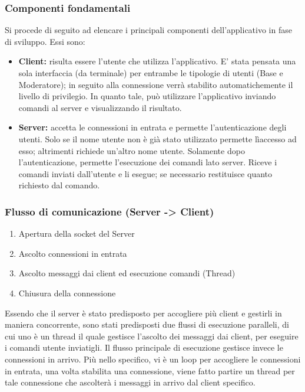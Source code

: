 \subsubsection{Componenti fondamentali}
Si procede di seguito ad elencare i principali componenti dell'applicativo in fase di sviluppo. Essi sono:
\begin{itemize}
    \item \textbf{Client:} risulta essere l'utente che utilizza l'applicativo. E' stata pensata una sola interfaccia (da terminale) per entrambe le tipologie di utenti (Base e Moderatore); in seguito alla connessione verrà stabilito automatichemente il livello di privilegio. In quanto tale, può utilizzare l'applicativo inviando comandi al server e visualizzando il risultato. \newline
    \item \textbf{Server: } accetta le connessioni in entrata e permette l'autenticazione degli utenti. Solo se il nome utente non è già stato utilizzato permette lìaccesso ad esso; altrimenti richiede un'altro nome utente. Solamente dopo l'autenticazione, permette l'esecuzione dei comandi lato server. Riceve i comandi inviati dall'utente e li esegue; se necessario restituisce quanto richiesto dal comando.
\end{itemize}

\subsubsection{Flusso di comunicazione (Server -> Client)}
\begin{enumerate}
    \item Apertura della socket del Server
    \item Ascolto connessioni in entrata
    \item Ascolto messaggi dai client ed esecuzione comandi (Thread)
    \item Chiusura della connessione
\end{enumerate}
Essendo che il server è stato predisposto per accogliere più client e gestirli in maniera concorrente, sono stati predisposti due flussi di esecuzione paralleli, di cui uno è un thread il quale gestisce l'ascolto dei messaggi dai client, per eseguire i comandi utente inviatigli. Il flusso principale di esecuzione gestisce invece le connessioni in arrivo. Più nello specifico, vi è un loop per accogliere le connessioni in entrata, una volta stabilita una connessione, viene fatto partire un thread per tale connessione che ascolterà i messaggi in arrivo dal client specifico.

